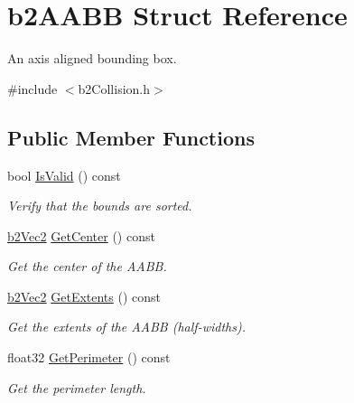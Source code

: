 \hypertarget{structb2AABB}{}\section{b2\+A\+A\+BB Struct Reference}
\label{structb2AABB}


An axis aligned bounding box.  




{\ttfamily \#include $<$b2\+Collision.\+h$>$}

\subsection*{Public Member Functions}
\begin{DoxyCompactItemize}
\item 
\mbox{\label{structb2AABB_a70bb45c086fcc2d7ee8694deb386070e}} 
bool \mbox{\hyperlink{structb2AABB_a70bb45c086fcc2d7ee8694deb386070e}{Is\+Valid}} () const
\begin{DoxyCompactList}\small\item\em Verify that the bounds are sorted. \end{DoxyCompactList}\item 
\mbox{\label{structb2AABB_a2c4051e79001a3166cc7f8ad811137fe}} 
\mbox{\hyperlink{structb2Vec2}{b2\+Vec2}} \mbox{\hyperlink{structb2AABB_a2c4051e79001a3166cc7f8ad811137fe}{Get\+Center}} () const
\begin{DoxyCompactList}\small\item\em Get the center of the A\+A\+BB. \end{DoxyCompactList}\item 
\mbox{\label{structb2AABB_a2a4f550a18d2a0895fbc5c4d3ec17d22}} 
\mbox{\hyperlink{structb2Vec2}{b2\+Vec2}} \mbox{\hyperlink{structb2AABB_a2a4f550a18d2a0895fbc5c4d3ec17d22}{Get\+Extents}} () const
\begin{DoxyCompactList}\small\item\em Get the extents of the A\+A\+BB (half-\/widths). \end{DoxyCompactList}\item 
\mbox{\label{structb2AABB_a25d2504d2f2fdec88f9347f62f112268}} 
float32 \mbox{\hyperlink{structb2AABB_a25d2504d2f2fdec88f9347f62f112268}{Get\+Perimeter}} () const
\begin{DoxyCompactList}\small\item\em Get the perimeter length. \end{DoxyCompactList}\item 

\end{DoxyCompactItemize}
